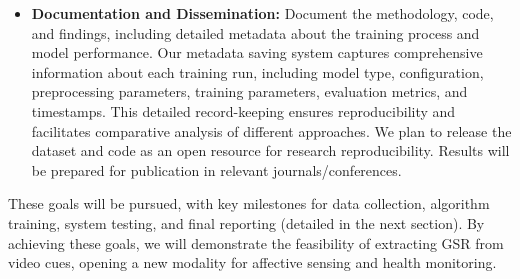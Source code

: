 \documentclass[12pt]{article}
\begin{document}
\begin{itemize}
        \item \textbf{Documentation and Dissemination:} Document the methodology, code, and findings, including detailed metadata about the training process and model performance. Our metadata saving system captures comprehensive information about each training run, including model type, configuration, preprocessing parameters, training parameters, evaluation metrics, and timestamps. This detailed record-keeping ensures reproducibility and facilitates comparative analysis of different approaches. We plan to release the dataset and code as an open resource for research reproducibility. Results will be prepared for publication in relevant journals/conferences.
    \end{itemize}

    These goals will be pursued, with key milestones for data collection, algorithm training, system testing, and final reporting (detailed in the next section). By achieving these goals, we will demonstrate the feasibility of extracting GSR from video cues, opening a new modality for affective sensing and health monitoring.
\end{document}
